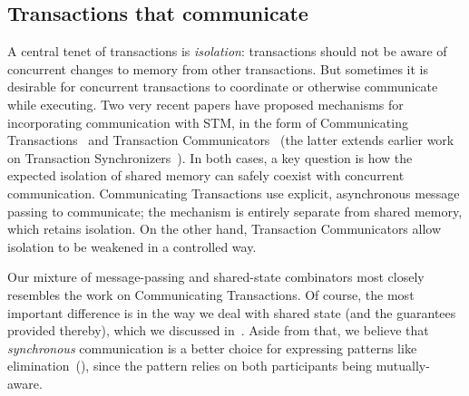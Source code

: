 \documentclass[preprint,nocopyrightspace]{sigplanconf}
\begin{document}
\subsection{Transactions that communicate}

A central tenet of transactions is \emph{isolation}: transactions should not
be aware of concurrent changes to memory from other transactions.  But
sometimes it is desirable for concurrent transactions to coordinate or
otherwise communicate while executing.  Two very recent papers have proposed
mechanisms for incorporating communication with STM, in the form of
Communicating Transactions~\cite{Lesani2011} and Transaction
Communicators~\cite{Luchangco2011b} (the latter extends earlier work on
Transaction Synchronizers~\cite{Luchangco2005}).  In both cases, a key
question is how the expected isolation of shared memory can safely coexist
with concurrent communication.  Communicating Transactions use explicit,
asynchronous message passing to communicate; the mechanism is entirely
separate from shared memory, which retains isolation.  On the other hand,
Transaction Communicators allow isolation to be weakened in a controlled way.

Our mixture of message-passing and shared-state combinators most closely
resembles the work on Communicating Transactions.  Of course, the most
important difference is in the way we deal with shared state (and the
guarantees provided thereby), which we discussed in~.  Aside from
that, we believe that \emph{synchronous} communication is a better choice for
expressing patterns like elimination~(), since the pattern
relies on both participants being mutually-aware.  %

\end{document}
